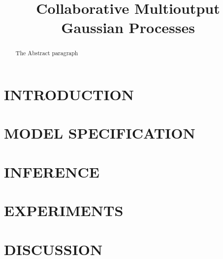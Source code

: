 \documentclass[]{article}
\title{Collaborative Multioutput Gaussian Processes}
\author{} %
\begin{document}
\maketitle

\begin{abstract}
The Abstract paragraph 
\end{abstract}

\section{INTRODUCTION}


\section{MODEL SPECIFICATION \label{sec:model}}


\section{INFERENCE \label{sec:inference}}


\section{EXPERIMENTS \label{sec:experiments}}


\section{DISCUSSION \label{sec:discussion}}





\end{document}
